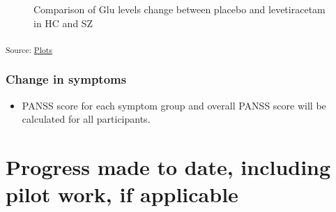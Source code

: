 \documentclass[
  letterpaper,
  DIV=11,
  numbers=noendperiod]{scrartcl}
\providecommand{\tightlist}{%
  \setlength{\itemsep}{0pt}\setlength{\parskip}{0pt}}\usepackage{longtable,booktabs,array}
\begin{document}
\begin{figure}


\caption{\label{fig-lev_hc_vs_sz}Comparison of Glu levels change between
placebo and levetiracetam in HC and SZ}

\end{figure}%

\textsubscript{Source:
\href{https://juliam98.github.io/phd-upgrade-proposal/notebooks/plots-preview.html\#cell-fig-lev_hc_vs_sz}{Plots}}

\subsubsection{Change in symptoms}\label{change-in-symptoms}

\begin{itemize}
\tightlist
\item
  PANSS score for each symptom group and overall PANSS score will be
  calculated for all participants.
\end{itemize}

\section{Progress made to date, including pilot work, if
applicable}\label{progress-made-to-date-including-pilot-work-if-applicable}
\end{document}

